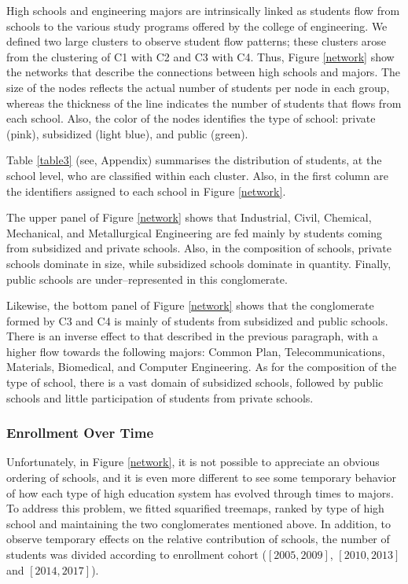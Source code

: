 \documentclass[5p,authoryear,preprint,12pt]{elsarticle}
\begin{document}
High schools and engineering majors are intrinsically linked as students flow from schools to the various study programs offered by the college of engineering. We defined two large clusters to observe student flow patterns; these clusters arose from the clustering of C1 with C2 and C3 with C4. Thus, Figure \ref{network} show the networks that describe the connections between high schools and majors. The size of the nodes reflects the actual number of students per node in each group, whereas the thickness of the line indicates the number of students that flows from each school. Also, the color of the nodes identifies the type of school: private (pink), subsidized (light blue), and public (green). 

Table \ref{table3} (see, Appendix) summarises the distribution of students, at the school level, who are classified within each cluster. Also, in the first column are the identifiers assigned to each school in Figure \ref{network}.

The upper panel of Figure \ref{network} shows that Industrial, Civil, Chemical, Mechanical, and Metallurgical Engineering are fed mainly by students coming from subsidized and private schools. Also, in the composition of schools, private schools dominate in size, while subsidized schools dominate in quantity. Finally, public schools are under--represented in this conglomerate. 

Likewise, the bottom panel of Figure \ref{network} shows that the conglomerate formed by C3 and C4 is mainly of students from subsidized and public schools. There is an inverse effect to that described in the previous paragraph, with a higher flow towards the following majors: Common Plan, Telecommunications, Materials, Biomedical, and Computer Engineering. As for the composition of the type of school, there is a vast domain of subsidized schools, followed by public schools and little participation of students from private schools. 

\subsubsection{Enrollment Over Time}

Unfortunately, in Figure \ref{network}, it is not possible to appreciate an obvious ordering of schools, and it is even more different to see some temporary behavior of how each type of high education system has evolved through times to majors. To address this problem, we fitted squarified treemaps, ranked by type of high school and maintaining the two conglomerates mentioned above. In addition, to observe temporary effects on the relative contribution of schools, the number of students was divided according to enrollment cohort ($\left[2005,2009\right]$, $\left[2010,2013\right]$ and $\left[2014,2017\right]$).
\end{document}
